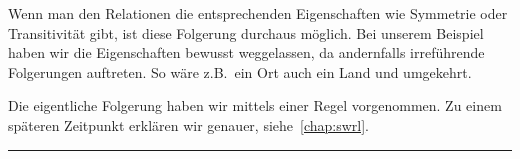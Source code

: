 Wenn man den Relationen die entsprechenden Eigenschaften wie Symmetrie oder Transitivität gibt, ist diese Folgerung durchaus möglich. Bei unserem Beispiel haben wir die Eigenschaften bewusst weggelassen, da andernfalls irreführende Folgerungen auftreten. So wäre z.B.\ ein Ort auch ein Land und umgekehrt.

Die eigentliche Folgerung haben wir mittels einer Regel vorgenommen. Zu einem späteren Zeitpunkt erklären wir genauer, siehe~\autoref{chap:swrl}.

\noindent\rule[1ex]{\textwidth}{1pt}
